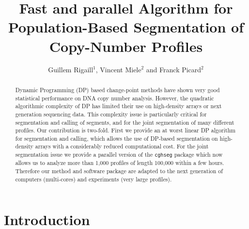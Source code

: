 \documentclass[11pt]{llncs}
\begin{document}
\title{Fast and parallel Algorithm for Population-Based Segmentation of Copy-Number Profiles}

%
%
\author{Guillem Rigaill$^1$, Vincent Miele$^2$ and Franck Picard$^2$}
%
%
%

\maketitle   

\begin{abstract}
  Dynamic Programming (DP) based change-point methods have shown very good statistical performance on DNA copy number analysis. However, the quadratic algorithmic complexity of DP has limited their use on high-density arrays or next generation sequencing data. This complexity issue is particularly critical for segmentation and calling of segments, and for the joint segmentation of many different profiles. Our contribution is two-fold. First we provide an at worst linear DP algorithm for segmentation and calling, which allows the use of DP-based segmentation on high-density arrays with a considerably reduced computational cost. For the joint segmentation issue we provide a parallel version of the \texttt{cghseg} package which now allows us to analyze more than 1,000 profiles of length 100,000 within a few hours. Therefore our method and software package are adapted to the next generation of computers (multi-cores) and experiments (very large profiles).
\end{abstract}


\newpage
\section{Introduction}
\end{document}
